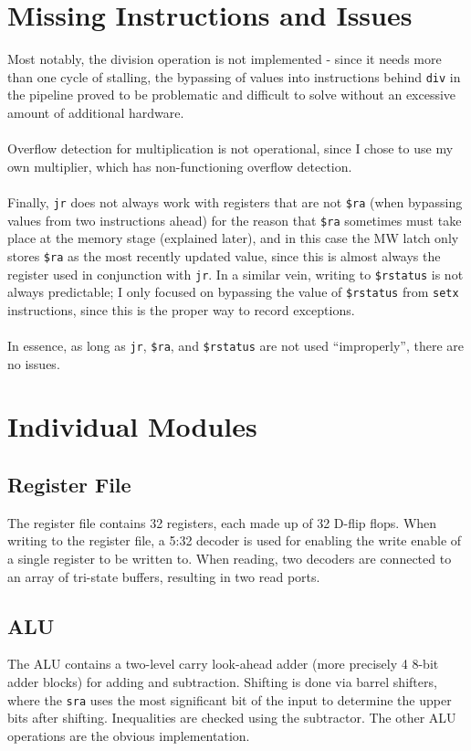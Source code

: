 \documentclass[letterpaper]{article} %
\begin{document}
\section*{Missing Instructions and Issues}
Most notably, the division operation is not implemented - since it needs more than one cycle of stalling, the bypassing of values into instructions behind \texttt{div} in the pipeline proved to be problematic and difficult to solve without an excessive amount of additional hardware. \\~\\
Overflow detection for multiplication is not operational, since I chose to use my own multiplier, which has non-functioning overflow detection. \\~\\
Finally, \texttt{jr} does not always work with registers that are not \texttt{\$ra} (when bypassing values from two instructions ahead) for the reason that \texttt{\$ra} sometimes must take place at the memory stage (explained later), and in this case the MW latch only stores \texttt{\$ra} as the most recently updated value, since this is almost always the register used in conjunction with \texttt{jr}. In a similar vein, writing to \texttt{\$rstatus} is not always predictable; I only focused on bypassing the value of \texttt{\$rstatus} from \texttt{setx} instructions, since this is the proper way to record exceptions. \\~\\
In essence, as long as \texttt{jr}, \texttt{\$ra}, and \texttt{\$rstatus} are not used ``improperly'', there are no issues.

\section*{Individual Modules}
\subsection*{Register File}
The register file contains 32 registers, each made up of 32 D-flip flops. When writing to the register file, a 5:32 decoder is used for enabling the write enable of a single register to be written to. When reading, two decoders are connected to an array of tri-state buffers, resulting in two read ports.
\subsection*{ALU}
The ALU contains a two-level carry look-ahead adder (more precisely 4 8-bit adder blocks) for adding and subtraction. Shifting is done via barrel shifters, where the \texttt{sra} uses the most significant bit of the input to determine the upper bits after shifting. Inequalities are checked using the subtractor. The other ALU operations are the obvious implementation.
\end{document}
